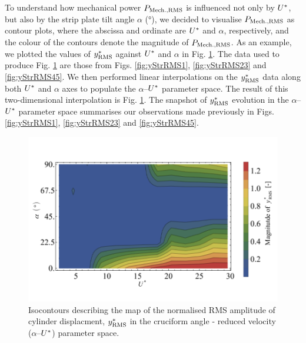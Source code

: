 \documentclass[oneside]{utmthesis}
\begin{document}
To understand how mechanical power $P_{\text{Mech.,RMS}}$ is influenced not only by $U^{*}$, but also by the strip plate tilt angle $\alpha$ (\si{\degree}), we decided to visualise $P_{\text{Mech.,RMS}}$ as contour plots, where the abscissa and ordinate are $U^{*}$ and $\alpha$, respectively, and the colour of the contours denote the magnitude of $P_{\text{Mech.,RMS}}$. As an example, we plotted the values of $y^{*}_{\text{RMS}}$ against $U^{*}$ and $\alpha$ in Fig. \ref{fig:yRMSContour}. The data used to produce Fig. \ref{fig:yRMSContour} are those from Figs. \ref{fig:yStrRMS1}, \ref{fig:yStrRMS23} and \ref{fig:yStrRMS45}. We then performed linear interpolations on the $y^{*}_{\text{RMS}}$ data along both $U^{*}$ and $\alpha$ axes to populate the $\alpha$--$U^{*}$ parameter space. The result of this two-dimensional interpolation is Fig. \ref{fig:yRMSContour}. The snapshot of $y^{*}_{\text{RMS}}$ evolution in the $\alpha$--$U^{*}$ parameter space summarises our observations made previously in Figs. \ref{fig:yStrRMS1}, \ref{fig:yStrRMS23} and \ref{fig:yStrRMS45}.

\begin{figure}
  \centering
  \includegraphics[width=1\textwidth]{figs/yRMSContour}
  \caption{Isocontours describing the map of the normalised RMS amplitude of cylinder displacment, $y^{*}_{\text{RMS}}$ in the cruciform angle - reduced velocity ($\alpha$--$U^{*}$) parameter space.}
  \label{fig:yRMSContour}
\end{figure}
\end{document}
